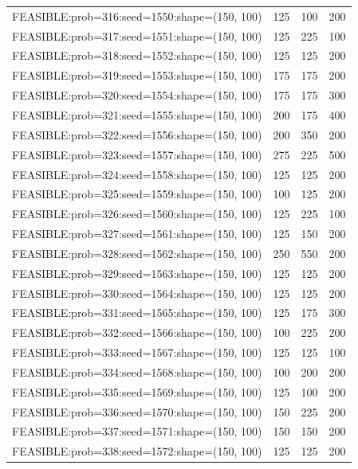 \begin{longtable}{lccc}
FEASIBLE:prob=316:seed=1550:shape=(150, 100) &      125 &   100 &    200 \\
FEASIBLE:prob=317:seed=1551:shape=(150, 100) &      125 &   225 &    100 \\
FEASIBLE:prob=318:seed=1552:shape=(150, 100) &      125 &   125 &    200 \\
FEASIBLE:prob=319:seed=1553:shape=(150, 100) &      175 &   175 &    200 \\
FEASIBLE:prob=320:seed=1554:shape=(150, 100) &      175 &   175 &    300 \\
FEASIBLE:prob=321:seed=1555:shape=(150, 100) &      200 &   175 &    400 \\
FEASIBLE:prob=322:seed=1556:shape=(150, 100) &      200 &   350 &    200 \\
FEASIBLE:prob=323:seed=1557:shape=(150, 100) &      275 &   225 &    500 \\
FEASIBLE:prob=324:seed=1558:shape=(150, 100) &      125 &   125 &    200 \\
FEASIBLE:prob=325:seed=1559:shape=(150, 100) &      100 &   125 &    200 \\
FEASIBLE:prob=326:seed=1560:shape=(150, 100) &      125 &   225 &    100 \\
FEASIBLE:prob=327:seed=1561:shape=(150, 100) &      125 &   150 &    200 \\
FEASIBLE:prob=328:seed=1562:shape=(150, 100) &      250 &   550 &    200 \\
FEASIBLE:prob=329:seed=1563:shape=(150, 100) &      125 &   125 &    200 \\
FEASIBLE:prob=330:seed=1564:shape=(150, 100) &      125 &   125 &    200 \\
FEASIBLE:prob=331:seed=1565:shape=(150, 100) &      125 &   175 &    300 \\
FEASIBLE:prob=332:seed=1566:shape=(150, 100) &      100 &   225 &    200 \\
FEASIBLE:prob=333:seed=1567:shape=(150, 100) &      125 &   125 &    100 \\
FEASIBLE:prob=334:seed=1568:shape=(150, 100) &      100 &   200 &    200 \\
FEASIBLE:prob=335:seed=1569:shape=(150, 100) &      125 &   100 &    200 \\
FEASIBLE:prob=336:seed=1570:shape=(150, 100) &      150 &   225 &    200 \\
FEASIBLE:prob=337:seed=1571:shape=(150, 100) &      150 &   150 &    200 \\
FEASIBLE:prob=338:seed=1572:shape=(150, 100) &      125 &   125 &    200 \\

\end{longtable}
